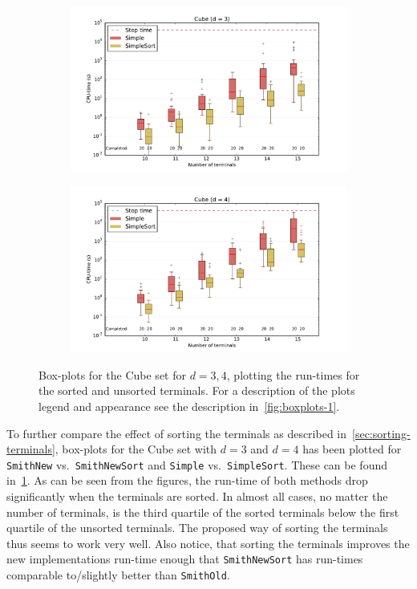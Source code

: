 \begin{figure}[htbp]
\begin{subfigure}[t]{0.5\textwidth}
  \end{subfigure}
  \begin{subfigure}[t]{0.5\textwidth}
    \includegraphics[width=\textwidth]{gfx/boxplots/plot_nvst_boxplot_d3_Cube_3}
  \end{subfigure}%
  \begin{subfigure}[t]{0.5\textwidth}
    \includegraphics[width=\textwidth]{gfx/boxplots/plot_nvst_boxplot_d4_Cube_3}
  \end{subfigure}%
  \caption[Box-plots: Unsorted terminals vs.\ sorted terminals]{Box-plots for
    the Cube set for $d = 3,4$, plotting the run-times for the sorted and
    unsorted terminals. For a description of the plots legend and appearance see
    the description in~\cref{fig:boxplots-1}.\label{fig:boxplots-2}}
\end{figure}
%
To further compare the effect of sorting the terminals as described
in~\cref{sec:sorting-terminals}, box-plots for the Cube set with $d = 3$ and $d
= 4$ has been plotted for \texttt{SmithNew} vs.\ \texttt{SmithNewSort} and
\texttt{Simple} vs.\ \texttt{SimpleSort}. These can be found
in~\cref{fig:boxplots-2}. As can be seen from the figures, the run-time of both
methods drop significantly when the terminals are sorted. In almost all cases,
no matter the number of terminals, is the third quartile of the sorted terminals
below the first quartile of the unsorted terminals. The proposed way of sorting
the terminals thus seems to work very well. Also notice, that sorting the
terminals improves the new implementations run-time enough that
\texttt{SmithNewSort} has run-times comparable to/slightly better than
\texttt{SmithOld}.

